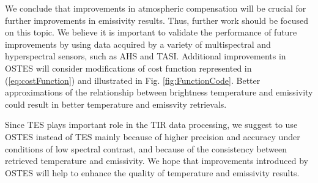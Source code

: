 We conclude that improvements in atmospheric compensation will be crucial for further improvements in emissivity results. Thus, further work should be focused on this topic. We believe it is important to validate the performance of future improvements by using data acquired by a variety of multispectral and hyperspectral sensors, such as AHS and TASI. Additional improvements in OSTES will consider modifications of cost function represented in (\ref{eq:costFunction}) and illustrated in Fig. \ref{fig:FunctionCode}. Better approximations of the relationship between brightness temperature and emissivity could result in better temperature and emissvity retrievals. 

Since TES plays important role in the TIR data processing, we suggest to use OSTES instead of TES mainly because of higher precision and accuracy under conditions of low spectral contrast, and because of the consistency between retrieved temperature and emissivity. We hope that improvements introduced by OSTES will help to enhance the quality of temperature and emissivity results.
